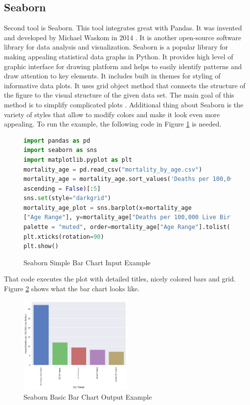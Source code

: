 \documentclass[sigconf]{acmart}
\begin{document}
\subsection{Seaborn}

Second tool is Seaborn. This tool integrates great with Pandas. It was invented and developed by Michael Waskom in 2014 \cite{waskom2014seaborn}. It is another  open-source software library for data analysis and visualization. Seaborn is a popular library for making appealing statistical data graphs in Python. It provides high level of graphic interface for drawing platform and helps to easily identify patterns and draw attention to key elements. It includes built in themes for styling of informative data plots. It uses grid object method that connects the structure of the figure to the visual structure of the given data set. The main goal of this method is to simplify complicated plots \cite{bloice2016tutorial}. Additional thing about Seaborn is the variety of styles that allow to modify colors and make it look even more appealing. To run the example, the following code in Figure \ref{fig:figure3} \cite{md} is needed.

\begin{figure}
\begin{lstlisting}[language=Python]
import pandas as pd
import seaborn as sns
import matplotlib.pyplot as plt
mortality_age = pd.read_csv("mortality_by_age.csv")
mortality_age = mortality_age.sort_values('Deaths per 100,000 Live Births:',
ascending = False)[:5]
sns.set(style="darkgrid")
mortality_age_plot = sns.barplot(x=mortality_age
["Age Range"], y=mortality_age["Deaths per 100,000 Live Births:"],
palette = "muted", order=mortality_age["Age Range"].tolist())
plt.xticks(rotation=90)
plt.show()
\end{lstlisting}
\caption{Seaborn Simple Bar Chart Input Example \cite{md} }
\label{fig:figure3}
\end{figure}

That code executes the plot with detailed titles, nicely colored bars and grid. Figure \ref{fig:figure4} \cite{md} shows what the bar chart looks like.

\begin{figure}
  \centering
  \includegraphics[width=0.5\textwidth]{images/output_1_0.png}
  \caption{Seaborn Basic Bar Chart Output Example \cite{md}} \label{fig:figure4} 
\end{figure}
\end{document}
